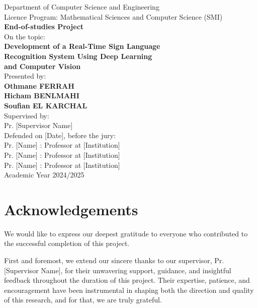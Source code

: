 \documentclass[11pt, a4paper]{article}
\begin{document}
\begin{titlepage}
\centering

{\large Department of Computer Science and Engineering}\\[0.5cm]
{\large Licence Program: Mathematical Sciences and Computer Science (SMI)}\\[2cm]

{\Huge\bfseries End-of-studies Project}\\[1cm]

{\Large On the topic:}\\[0.5cm]
{\huge\bfseries Development of a Real-Time Sign Language\\
Recognition System Using Deep Learning\\
and Computer Vision}\\[2cm]

{\large Presented by:}\\[0.5cm]
{\Large\bfseries Othmane FERRAH}\\
{\Large\bfseries Hicham BENLMAHI}\\
{\Large\bfseries Soufian EL KARCHAL}\\[1.5cm]

{\large Supervised by:}\\[0.5cm]
{\Large Pr. [Supervisor Name]}\\[1.5cm]

{\large Defended on [Date], before the jury:}\\[0.5cm]
Pr. [Name] : Professor at [Institution]\\
Pr. [Name] : Professor at [Institution]\\
Pr. [Name] : Professor at [Institution]\\[2cm]

{\large Academic Year 2024/2025}

\end{titlepage}

\section*{Acknowledgements}
We would like to express our deepest gratitude to everyone who contributed to the successful completion of this project.

First and foremost, we extend our sincere thanks to our supervisor, Pr. [Supervisor Name], for their unwavering support, guidance, and insightful feedback throughout the duration of this project. Their expertise, patience, and encouragement have been instrumental in shaping both the direction and quality of this research, and for that, we are truly grateful.
\end{document}
